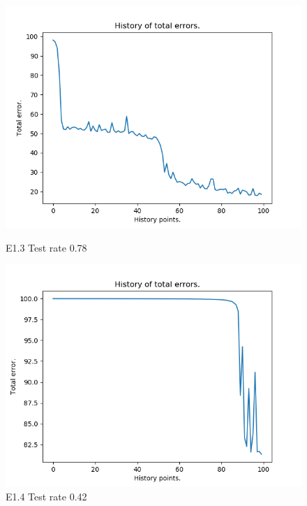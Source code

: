 \documentclass{classrep}
\begin{document}
\begin{figure}[H]
\begin{minipage}{0.5\linewidth}
				\centering
				\includegraphics[scale=0.25]{iris_nn_s12.png}
				\caption{E1.3 Test rate  0.78}
			\end{minipage}
			\begin{minipage}{0.5\linewidth}
				\centering
				\includegraphics[scale=0.25]{iris_nn_s20.png}
				\caption{E1.4 Test rate  0.42}
			\end{minipage}
		\end{figure}
		\FloatBarrier
\end{document}
